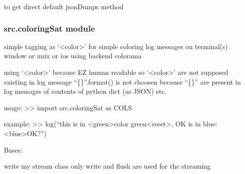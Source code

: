 \documentclass[a4paper,10pt,english]{sphinxmanual}
\begin{document}

\begin{fulllineitems}
\label{\detokenize{apidoc_src/src:src.catchAll.jsonDumps}}
to get direct default jsonDumps method

\end{fulllineitems}



\subsubsection{src.coloringSat module}
\label{\detokenize{apidoc_src/src:module-src.coloringSat}}\label{\detokenize{apidoc_src/src:src-coloringsat-module}}
simple tagging as ‘\textless{}color\textgreater{}’ for simple coloring log messages on terminal(s)
window or unix or ios using backend colorama

using ‘\textless{}color\textgreater{}’ because EZ human readable
so ‘\textless{}color\textgreater{}’ are not supposed existing in log message
“\{\}”.format() is not choosen because “\{\}” are present
in log messages of contents of python dict (as JSON) etc.

usage:
\textgreater{}\textgreater{} import src.coloringSat as COLS

example:
\textgreater{}\textgreater{} log(“this is in \textless{}green\textgreater{}color green\textless{}reset\textgreater{}, OK is in blue: \textless{}blue\textgreater{}OK?”)

\begin{fulllineitems}
\label{\detokenize{apidoc_src/src:src.coloringSat.ColoringStream}}
Bases: 

write my stream class
only write and flush are used for the streaming

\begin{fulllineitems}
\label{\detokenize{apidoc_src/src:src.coloringSat.ColoringStream.flush}}
\end{fulllineitems}


\begin{fulllineitems}
\label{\detokenize{apidoc_src/src:src.coloringSat.ColoringStream.write}}
\end{fulllineitems}


\end{fulllineitems}
\end{document}
